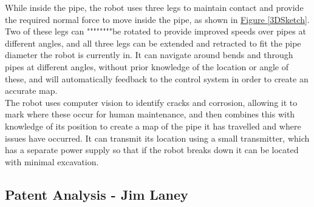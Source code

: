 \documentclass[11pt]{article}		%
\newcommand{\figref}[1]{\hyperref[#1]{Figure \ref*{#1}}}    %
\begin{document}
		While inside the pipe, the robot uses three legs to maintain contact and provide the required normal force to move inside the pipe, as shown in \figref{3DSketch}.
		Two of these legs can """"""""be rotated to provide improved speeds over pipes at different angles, and all three legs can be extended and retracted to fit the pipe diameter the robot is currently in.
		It can navigate around bends and through pipes at different angles, without prior knowledge of the location or angle of these, and will automatically feedback to the control system in order to create an accurate map.
		\\
		The robot uses computer vision to identify cracks and corrosion, allowing it to mark where these occur for human maintenance, and then combines this with knowledge of its position to create a map of the pipe it has travelled and where issues have occurred.
		It can transmit its location using a small transmitter, which has a separate power supply so that if the robot breaks down it can be located with minimal excavation.
	
	\subsection[Patent Analysis]{Patent Analysis - Jim Laney}
\end{document}
